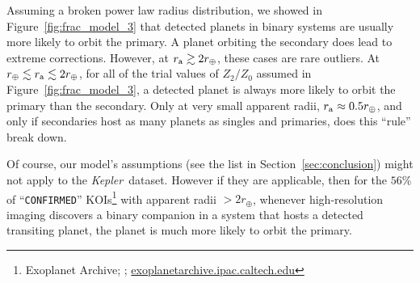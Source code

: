 \documentclass[12pt,modern]{aastex61}
\renewcommand{\a}{_{\rm a}}
\begin{document}

Assuming a broken power law radius distribution, we showed in 
Figure~\ref{fig:frac_model_3} that detected 
planets in binary systems are usually more likely to orbit the primary.
A planet orbiting the secondary does lead to extreme corrections.
However, at $r\a \gtrsim 2r_\oplus$, these cases are rare outliers.
At $r_\oplus \lesssim r\a \lesssim 2r_\oplus$, for all of the trial values of 
$Z_2/Z_0$ assumed in Figure~\ref{fig:frac_model_3}, a detected planet is 
always 
more likely to orbit the primary than the secondary.
Only at very small apparent radii, $r\a \approx 0.5r_\oplus$, and only if 
secondaries host as many planets as singles and primaries, does this ``rule'' 
break down.

Of course, our model's assumptions (see the list in Section~\ref{sec:conclusion}) 
might not apply to the {\it Kepler}\ dataset.
However if they are applicable, then for the $56\%$ of ``\texttt{CONFIRMED}'' 
KOIs\footnote{Exoplanet Archive; \cite{akeson_nasa_2013}; 
    \url{exoplanetarchive.ipac.caltech.edu}} with 
apparent radii $>2r_\oplus$, 
whenever high-resolution imaging 
discovers a binary companion in 
a system that hosts a detected transiting planet, the planet is much
more likely to orbit the primary.
\end{document}
